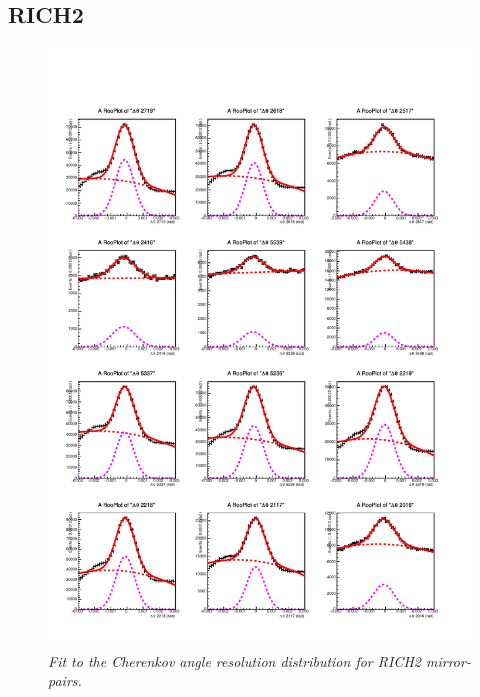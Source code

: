 \subsection{RICH2}
\begin{figure}[!h]
	\vspace*{-0.cm}
	\begin{center}
		\includegraphics[width=1.\textwidth]{rich2_p1.pdf}
		\vspace*{-1.5cm}
	\end{center}
	\caption{\textit{Fit to the Cherenkov angle resolution distribution for RICH2 mirror-pairs.}}
	\label{fig:rich2p1}
\end{figure}
\clearpage
